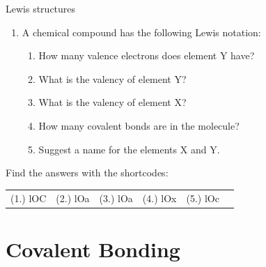 \begin{exercises}{Lewis structures}
\begin{enumerate}[noitemsep, label=\textbf{\arabic*}. ]
\begin{enumerate}[noitemsep, label=\textbf{\alph*}. ]
\end{enumerate}
                \label{m38701*uid38}\item A chemical compound has the following Lewis notation:
    \setcounter{subfigure}{0}
	\begin{figure}[H] %
\begin{center}
\end{center}
 \end{figure}       \label{m38701*id141181}\begin{enumerate}[noitemsep, label=\textbf{\alph*}. ] 
            \label{m38701*uid39}\item How many valence electrons does element $\text{Y}$ have?
\label{m38701*uid40}\item What is the valency of element $\text{Y}$?
\label{m38701*uid41}\item What is the valency of element $\text{X}$?
\label{m38701*uid42}\item How many covalent bonds are in the molecule?
\label{m38701*uid43}\item Suggest a name for the elements $\text{X}$ and $\text{Y}$.
\end{enumerate}
                \end{enumerate}
  \label{m38701**end}
\par {} Find the answers with the shortcodes:
 \par \begin{tabular}[h]{cccccc}
 (1.) lOC  &  (2.) lOa  &  (3.) lOa  &  (4.) lOx  &  (5.) lOc  & \end{tabular}
\end{exercises}
    \label{m38704*cid5}
            \section{Covalent Bonding}
            \nopagebreak
            \label{m38704*uid6}
